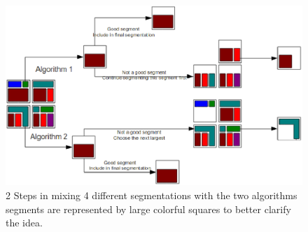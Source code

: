 \message{ !name(thesis.tex)}\documentclass[twoside,11pt]{article}
\begin{document}
\begin{figure}
\includegraphics[scale =.8]{./Figures/mixsegs.eps}
\centering
\caption{2 Steps in mixing 4 different segmentations with the two algorithms
segments are represented by large colorful squares to better clarify the idea.}
\label{fig:mixsegsalgo}
\end{figure}
\end{document}
